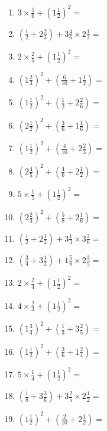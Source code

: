 \documentclass[12pt]{article}
\begin{document}
\begin{enumerate}
\item \large $ 3 \times \frac{5}{6} + (1 \frac{1}{2})^2 = $ \vspace{1.8cm}
\item \large $ (\frac{1}{2} + 2 \frac{2}{3}) + 3 \frac{4}{6} \times 2 \frac{1}{2} = $ \vspace{1.8cm}
\item \large $ 2 \times \frac{2}{5} + (1 \frac{1}{2})^2 = $ \vspace{1.8cm}
\item \large $ (1 \frac{2}{3})^2 + (\frac{6}{10} + 1 \frac{1}{2}) = $ \vspace{1.8cm}
\item \large $ (1 \frac{1}{2})^2 + (\frac{1}{2} + 2 \frac{2}{6}) = $ \vspace{1.8cm}
\item \large $ (2 \frac{1}{2})^2 + (\frac{3}{6} + 1 \frac{1}{6}) = $ \vspace{1.8cm}
\item \large $ (1 \frac{1}{2})^2 + (\frac{4}{10} + 2 \frac{2}{3}) = $ \vspace{1.8cm}
\item \large $ (2 \frac{4}{5})^2 + (\frac{4}{6} + 2 \frac{1}{2}) = $ \vspace{1.8cm}
\item \large $ 5 \times \frac{1}{5} + (1 \frac{1}{2})^2 = $ \vspace{1.8cm}
\newpage
\item \large $ (2 \frac{2}{3})^2 + (\frac{5}{8} + 2 \frac{1}{6}) = $ \vspace{1.8cm}
\item \large $ (\frac{1}{2} + 2 \frac{1}{2}) + 3 \frac{1}{3} \times 3 \frac{3}{6} = $ \vspace{1.8cm}
\item \large $ (\frac{3}{4} + 3 \frac{1}{2}) + 1 \frac{5}{6} \times 2 \frac{3}{5} = $ \vspace{1.8cm}
\item \large $ 2 \times \frac{2}{4} + (1 \frac{1}{2})^2 = $ \vspace{1.8cm}
\item \large $ 4 \times \frac{2}{3} + (1 \frac{1}{2})^2 = $ \vspace{1.8cm}
\item \large $ (1 \frac{3}{4})^2 + (\frac{1}{3} + 3 \frac{2}{5}) = $ \vspace{1.8cm}
\item \large $ (1 \frac{1}{2})^2 + (\frac{3}{6} + 1 \frac{2}{4}) = $ \vspace{1.8cm}
\item \large $ 5 \times \frac{1}{4} + (1 \frac{1}{2})^2 = $ \vspace{1.8cm}
\item \large $ (\frac{1}{8} + 3 \frac{3}{6}) + 3 \frac{2}{5} \times 2 \frac{1}{2} = $ \vspace{1.8cm}
\item \large $ (1 \frac{1}{2})^2 + (\frac{2}{10} + 2 \frac{1}{2}) = $ \vspace{1.8cm}
\end{enumerate}\newpage
\end{document}
